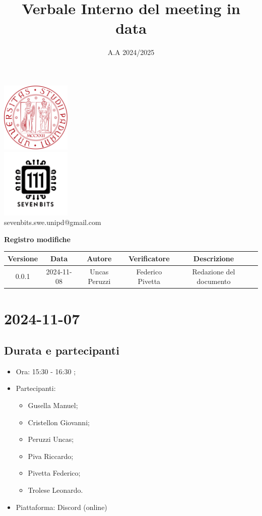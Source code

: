 \documentclass[10pt]{article}
\title{Verbale Interno del meeting in data}
\date{A.A 2024/2025}
\begin{document}
\maketitle
\center 
\includegraphics[width=0.25\textwidth]{LogoUnipd}\\
\includegraphics[width=0.25\textwidth]{Sevenbitslogo}\\
sevenbits.swe.unipd@gmail.com\\
\vspace{2mm}

\textbf{Registro modifiche}\\
\vspace{2mm}
\begin{tabular}{|c|c|c|c|c|c|}
\hline
\textbf{Versione} & \textbf{Data} & \textbf{Autore} & \textbf{Verificatore} & \textbf{Descrizione} \\
\hline
0.0.1 & 2024-11-08 & Uncas Peruzzi & Federico Pivetta & Redazione del documento \\
\hline
\end{tabular}

\raggedright
\newpage
\tableofcontents
\newpage
\section{2024-11-07}
\subsection{Durata e partecipanti}
\begin{itemize}
\item Ora: 15:30 - 16:30 ;
\item Partecipanti: 	
	\begin{itemize}
	\item Gusella Manuel;
	\item Cristellon Giovanni;
	\item Peruzzi Uncas;
	\item Piva Riccardo;
	\item Pivetta Federico;
	\item Trolese Leonardo.
	\end{itemize}
\item Piattaforma: Discord (online)
\end{itemize}
\end{document}
